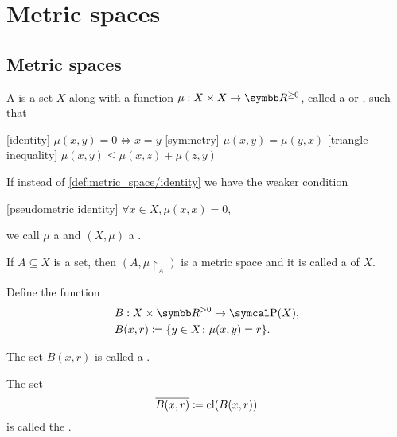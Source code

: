 \section{Metric spaces}\label{sec:metric_spaces}
\subsection{Metric spaces}\label{subsec:metric_spaces}

\begin{definition}\label{def:metric_space}\cite[248]{Engelking1989}
  A  is a set \( X \) along with a function \( \mu: X \times X \to \R^{\geq 0} \), called a  or , such that
  \begin{description}
    [identity] \( \mu(x, y) = 0 \iff x = y \)
    [symmetry] \( \mu(x, y) = \mu(y, x) \)
    [triangle inequality] \( \mu(x, y) \leq \mu(x, z) + \mu(z, y) \)
  \end{description}

  If instead of \ref{def:metric_space/identity} we have the weaker condition
  \begin{description}
    [pseudometric identity] \( \forall x \in X, \mu(x, x) = 0 \),
  \end{description}
  we call \( \mu \) a  and \( (X, \mu) \) a .

  \begin{defenum}
     If \( A \subseteq X \) is a set, then \( (A, \mu{\restriction_A}) \) is a metric space and it is called a  of $X$.

     Define the function
    \begin{align*}
      &B: X \times \R^{>0} \to \Power(X), \\
      &B(x, r) \coloneqq \{ y \in X \colon \mu(x, y) = r \}.
    \end{align*}

    The set \( B(x, r) \) is called a .

     The set
    \begin{equation*}
      \overline{B(x, r)} \coloneqq \operatorname{cl}(B(x, r))
    \end{equation*}
    is called the .


\end{defenum}
\end{definition}
